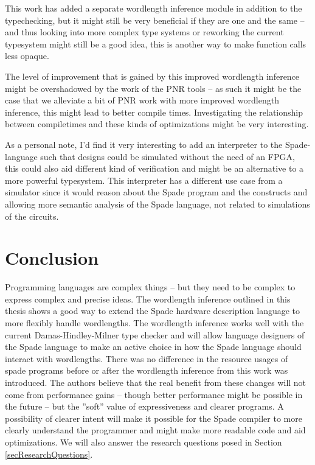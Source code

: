 This work has added a separate wordlength inference module in addition to the typechecking, but it might still be very beneficial if they are one and the same -- and thus looking into more complex type systems or reworking the current typesystem might still be a good idea, this is another way to make function calls less opaque.

The level of improvement that is gained by this improved wordlength inference might be overshadowed by the work of the PNR tools -- as such it might be the case that we alleviate a bit of PNR work with more improved wordlength inference, this might lead to better compile times. Investigating the relationship between compiletimes and these kinds of optimizations might be very interesting.

As a personal note, I'd find it very interesting to add an interpreter to the Spade-language such that designs could be simulated without the need of an FPGA, this could also aid different kind of verification and might be an alternative to a more powerful typesystem. This interpreter has a different use case from a simulator since it would reason about the Spade program and the constructs and allowing more semantic analysis of the Spade language, not related to simulations of the circuits.

\chapter{Conclusion}
\label{cha:Conclusion}
Programming languages are complex things -- but they need to be complex to express complex and precise ideas. The wordlength inference outlined in this thesis shows a good way to extend the Spade hardware description language to more flexibly handle wordlengths. The wordlength inference works well with the current Damas-Hindley-Milner type checker and will allow language designers of the Spade language to make an active choice in how the Spade language should interact with wordlengths. There was no difference in the resource usages of spade programs before or after the wordlength inference from this work was introduced. The authors believe that the real benefit from these changes will not come from performance gains -- though better performance might be possible in the future -- but the ''soft'' value of expressiveness and clearer programs. A possibility of clearer intent will make it possible for the Spade compiler to more clearly understand the programmer and might make more readable code and aid optimizations. We will also answer the research questions posed in Section \ref{secResearchQuestions}.


